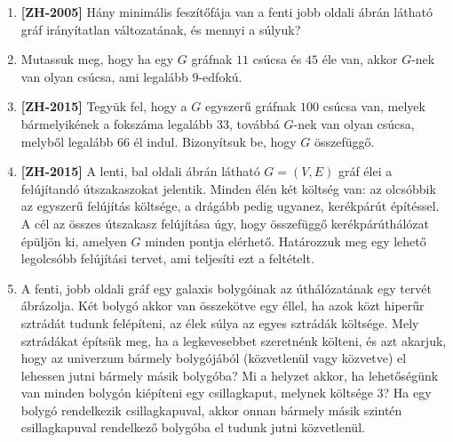 \documentclass[a4paper,12pt]{article}
\begin{document}
\begin{enumerate}
        \hrule

        \item \textbf{[ZH-2005]} Hány minimális feszítőfája van a fenti jobb oldali ábrán látható gráf irányítatlan változatának, és mennyi a súlyuk?
        
        \item Mutassuk meg, hogy ha egy $G$ gráfnak $11$ csúcsa és $45$ éle van, akkor $G$-nek van olyan csúcsa, ami legalább $9$-edfokú.
        
        \item \textbf{[ZH-2015]} Tegyük fel, hogy a $G$ egyszerű gráfnak $100$ csúcsa van, melyek bármelyikének a fokszáma legalább $33$, továbbá $G$-nek van olyan csúcsa, melyből legalább $66$ él indul. Bizonyítsuk be, hogy $G$ összefüggő.
        
        \item \textbf{[ZH-2015]} A lenti, bal oldali ábrán látható $G = (V, E)$ gráf élei a felújítandó útszakaszokat jelentik. Minden élén két költség van: az olcsóbbik az egyszerű felújítás költsége, a drágább pedig ugyanez, kerékpárút építéssel. A cél az összes útszakasz felújítása úgy, hogy összefüggő kerékpárúthálózat épüljön ki, amelyen $G$ minden pontja elérhető. Határozzuk meg egy lehető legolcsóbb felújítási tervet, ami teljesíti ezt a feltételt.
        
        \begin{figure}[h]
            \centering
            \begin{subfigure}{0.45\textwidth}
                \centering
                 \hspace{1in}
            \end{subfigure}
            \begin{subfigure}{0.45\textwidth}
                \centering
                
            \end{subfigure}
        \end{figure}
        
        \item A fenti, jobb oldali gráf egy galaxis bolygóinak az úthálózatának egy tervét ábrázolja. Két bolygó akkor van összekötve egy éllel, ha azok közt hiperűr sztrádát tudunk felépíteni, az élek súlya az egyes sztrádák költsége. Mely sztrádákat építsük meg, ha a legkevesebbet szeretnénk költeni, és azt akarjuk, hogy az univerzum bármely bolygójából (közvetlenül vagy közvetve) el lehessen jutni bármely másik bolygóba? Mi a helyzet akkor, ha lehetőségünk van minden bolygón kiépíteni egy csillagkaput, melynek költsége $3$? Ha egy bolygó rendelkezik csillagkapuval, akkor onnan bármely másik szintén csillagkapuval rendelkező bolygóba el tudunk jutni közvetlenül.


\end{enumerate}
\end{document}
